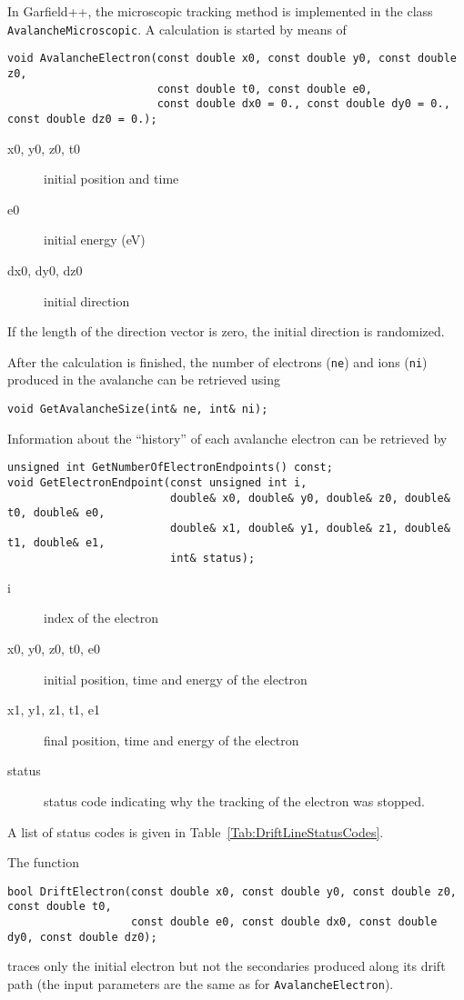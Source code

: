 In Garfield++, the microscopic tracking method is implemented in the class 
\texttt{AvalancheMicroscopic}. A calculation is started by means of
\begin{lstlisting}
void AvalancheElectron(const double x0, const double y0, const double z0,
                       const double t0, const double e0,
                       const double dx0 = 0., const double dy0 = 0., const double dz0 = 0.);
\end{lstlisting}
\begin{description}
  \item[x0, y0, z0, t0] initial position and time
  \item[e0] initial energy (eV)
  \item[dx0, dy0, dz0] initial direction 
\end{description}
If the length of the direction vector is zero, 
the initial direction is randomized.

After the calculation is finished, the number of electrons 
(\texttt{ne}) and ions (\texttt{ni})  
produced in the avalanche can be retrieved using
\begin{lstlisting}
void GetAvalancheSize(int& ne, int& ni);
\end{lstlisting}
Information about the ``history'' of each avalanche electron can be 
retrieved by
\begin{lstlisting}
unsigned int GetNumberOfElectronEndpoints() const;
void GetElectronEndpoint(const unsigned int i, 
                         double& x0, double& y0, double& z0, double& t0, double& e0,
                         double& x1, double& y1, double& z1, double& t1, double& e1,
                         int& status); 
\end{lstlisting}
\begin{description}
  \item[i] index of the electron
  \item[x0, y0, z0, t0, e0] initial position, time and energy of the electron
  \item[x1, y1, z1, t1, e1] final position, time and energy of the electron
  \item[status] status code indicating why the tracking of the electron was stopped.  
\end{description}
A list of status codes is given in Table~\ref{Tab:DriftLineStatusCodes}.

The function
\begin{lstlisting}
bool DriftElectron(const double x0, const double y0, const double z0, const double t0,
                   const double e0, const double dx0, const double dy0, const double dz0);
\end{lstlisting}
traces only the initial electron but not the secondaries 
produced along its drift path 
(the input parameters are the same as for \texttt{AvalancheElectron}).

